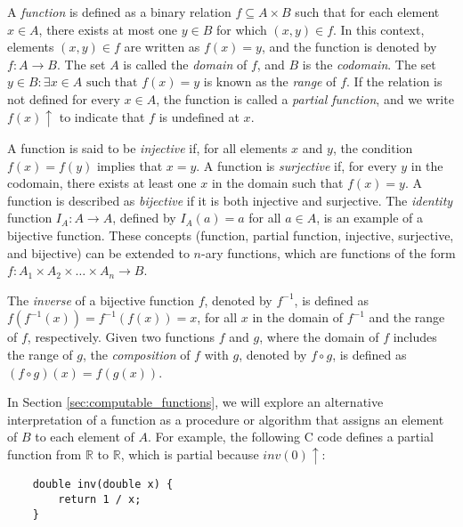 
A \emph{function} is defined as a binary relation $f \subseteq A \times B$ such that for each element $x \in A$, there exists at most one $y \in B$ for which $\left(x, y\right) \in f$. In this context, elements $\left(x, y\right) \in f$ are written as $f(x) = y$, and the function is denoted by $f : A \rightarrow B$. The set $A$ is called the \emph{domain} of $f$, and $B$ is the \emph{codomain}. The set ${ y \in B : \exists x \in A \text{ such that } f(x) = y }$ is known as the \emph{range} of $f$. If the relation is not defined for every $x \in A$, the function is called a \emph{partial function}, and we write $f(x) \uparrow$ to indicate that $f$ is undefined at $x$.

A function is said to be \emph{injective} if, for all elements $x$ and $y$, the condition $f(x) = f(y)$ implies that $x = y$. A function is \emph{surjective} if, for every $y$ in the codomain, there exists at least one $x$ in the domain such that $f(x) = y$. A function is described as \emph{bijective} if it is both injective and surjective. The \emph{identity} function $I_A : A \rightarrow A$, defined by $I_A(a) = a$ for all $a \in A$, is an example of a bijective function. These concepts (function, partial function, injective, surjective, and bijective) can be extended to $n$-ary functions, which are functions of the form $f: A_1 \times A_2 \times \dots \times A_n \rightarrow B$.

The \emph{inverse} of a bijective function $f$, denoted by $f^{-1}$, is defined as $f(f^{-1}(x)) = f^{-1}(f(x)) = x$, for all $x$ in the domain of $f^{-1}$ and the range of $f$, respectively. Given two functions $f$ and $g$, where the domain of $f$ includes the range of $g$, the \emph{composition} of $f$ with $g$, denoted by $f \circ g$, is defined as $(f \circ g)(x) = f(g(x))$.

\begin{example}
In Section \ref{sec:computable_functions}, we will explore an alternative interpretation of a function as a procedure or algorithm that assigns an element of $B$ to each element of $A$. For example, the following C code defines a partial function from $\mathbb{R}$ to $\mathbb{R}$, which is partial because $inv(0) \uparrow$:
\begin{verbatim}
    double inv(double x) {
        return 1 / x;
    }
\end{verbatim}
\end{example}

